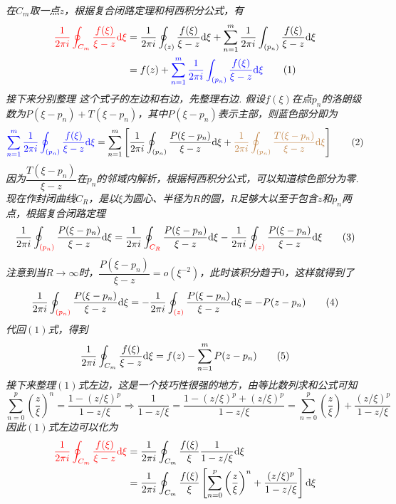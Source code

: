 \documentclass[main.tex]{subfiles}
\begin{document}
\textit{
在\(C_m\)取一点\(z\)，根据复合闭路定理和柯西积分公式，有
\begin{align}
    {\color{red} \frac{1}{2\pi i}\oint_{C_m}\frac{f(\xi)}{\xi-z}{\rm d}\xi} &= 
    \frac{1}{2\pi i}\oint_{(z)}\frac{f(\xi)}{\xi-z}{\rm d}\xi
    +\sum_{n=1}^m\frac{1}{2\pi i}\int_{(p_n)}\frac{f(\xi)}{\xi-z}{\rm d}\xi \notag \\ 
    &= f(z) + {\color{blue}\sum_{n=1}^m\frac{1}{2\pi i}\int_{(p_n)}\frac{f(\xi)}{\xi-z}{\rm d}\xi} \tag{1}
\end{align} 
接下来分别整理 这个式子的左边和右边，先整理右边. 假设\(f(\xi)\)在点\(p_n\)的洛朗级数为\(P(\xi-p_n)+T(\xi-p_n)\)，其中\(P(\xi-p_n)\)表示主部，则蓝色部分即为
\[{\color{blue}\sum_{n=1}^m\frac{1}{2\pi i}\oint_{(p_n)}\frac{f(\xi)}{\xi-z}{\rm d}\xi} = 
\sum_{n=1}^m\left[\frac{1}{2\pi i}\oint_{(p_n)}\frac{P(\xi-p_n)}{\xi-z}{\rm d}\xi
+{\color{brown}\frac{1}{2\pi i}\oint_{(p_n)}\frac{T(\xi-p_n)}{\xi-z}{\rm d}\xi}\right] 
\tag{2}\]
因为\(\dfrac{T(\xi-p_n)}{\xi-z}\)在\(p_n\)的邻域内解析，根据柯西积分公式，可以知道棕色部分为零. 现在作封闭曲线\(C_R\)，是以\(\xi\)为圆心、半径为\(R\)的圆，\(R\)足够大以至于包含\(z\)和\(p_n\)两点，根据复合闭路定理
\[\frac{1}{2\pi i}\oint_{\color{red}(p_n)}\frac{P(\xi-p_n)}{\xi-z}{\rm d}\xi = 
\frac{1}{2\pi i}\oint_{\color{red}C_R}\frac{P(\xi-p_n)}{\xi-z}{\rm d}\xi 
- \frac{1}{2\pi i}\oint_{\color{red}(z)}\frac{P(\xi-p_n)}{\xi-z}{\rm d}\xi
\tag{3}\]
注意到当\(R\to\infty\)时，\(\dfrac{P(\xi-p_n)}{\xi-z}=o(\xi^{-2})\)，此时该积分趋于\(0\)，这样就得到了
\[\frac{1}{2\pi i}\oint_{\color{red}(p_n)}\frac{P(\xi-p_n)}{\xi-z}{\rm d}\xi = -\frac{1}{2\pi i}\oint_{\color{red}(z)}\frac{P(\xi-p_n)}{\xi-z}{\rm d}\xi = -P(z-p_n)\tag{4}\]
代回\((1)\)式，得到
\[\frac{1}{2\pi i}\oint_{C_m}\frac{f(\xi)}{\xi-z}{\rm d}\xi = f(z) - \sum_{n=1}^{m}P(z-p_n) \tag{5}\]
接下来整理\((1)\)式左边，这是一个技巧性很强的地方，由等比数列求和公式可知
\[\sum_{n=0}^{p}\left(\frac{z}{\xi}\right)^n = \frac{1-(z/\xi)^p}{1-z/\xi} \Longrightarrow \frac{1}{1-z/\xi} = \frac{1-(z/\xi)^p+(z/\xi)^p}{1-z/\xi} = \sum_{n=0}^{p}\left(\frac{z}{\xi}\right)+\frac{(z/\xi)^p}{1-z/\xi}\]
因此\((1)\)式左边可以化为
\begin{align}
    {\color{red} \frac{1}{2\pi i}\oint_{C_m}\frac{f(\xi)}{\xi-z}\trm{d}\xi} &= 
    \frac{1}{2\pi i}\oint_{C_m}\frac{f(\xi)}{\xi}\frac{1}{1-z/\xi}\trm{d}\xi \notag \\
    &= \frac{1}{2\pi i}\oint_{C_m}\frac{f(\xi)}{\xi}\left[\sum_{n=0}^{p}\left(\frac{z}{\xi}\right)^n+\frac{(z/\xi)^p}{1-z/\xi}\right]\trm{d}\xi \notag \\

\end{align}}
\end{document}
